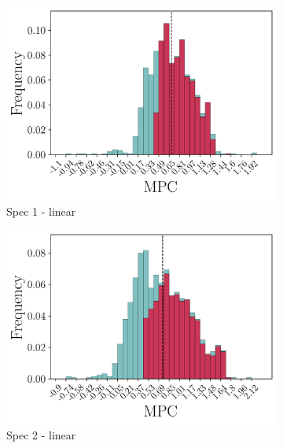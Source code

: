 \begin{figure}[t]
    \centering
    \begin{subfigure}{0.33\linewidth}
        \includegraphics[width=\linewidth]{figures/distributions/spec1_lin_chTOTexp.png}
        \caption{Spec 1 - linear}
    \end{subfigure}\hfill
    \begin{subfigure}{0.33\linewidth}
        \includegraphics[width=\linewidth]{figures/distributions/spec2_lin_chTOTexp.png}
        \caption{Spec 2 - linear}
    \end{subfigure}\hfill
    \begin{subfigure}{0.33\linewidth}

\end{subfigure}
\end{figure}
